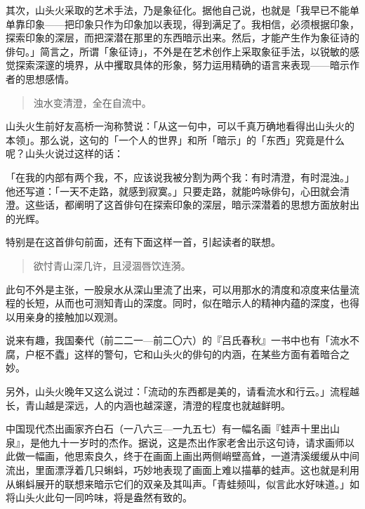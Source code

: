 {    其次，山头火采取的艺术手法，乃是象征化。据他自己说，也就是「我早已不能单单靠印象——把印象只作为印象加以表现，得到满足了。我相信，必须根据印象，探索印象的深层，而把深潜在那里的东西暗示出来。然后，才能产生作为象征诗的俳句。」\footnotemark[4]简言之，所谓「象征诗」，不外是在艺术创作上采取象征手法，以锐敏的感觉探索深邃的境界，从中攫取具体的形象，努力运用精确的语言来表现——暗示作者的思想感情。


    \begin{quote}        浊水变清澄，全在自流中。
    \end{quote}

    山头火生前好友高桥一洵称赞说：「从这一句中，可以千真万确地看得出山头火的本领」\footnotemark[5]。那么说，这句的「一个人的世界」和所「暗示」的「东西」究竟是什么呢？山头火说过这样的话：


    「在我的内部有两个我，不，应该说我被分割为两个我：有时清澄，有时混浊。」他还写道：「一天不走路，就感到寂寞。」只要走路，就能吟咏俳句，心田就会清澄\footnotemark[6]。这些话，都阐明了这首俳句在探索印象的深层，暗示深潜着的思想方面放射出的光辉。


    特别是在这首俳句前面，还有下面这样一首，引起读者的联想。

    \begin{quote}
        欲忖青山深几许，且浸涸唇饮连漪。
    \end{quote}

    此句不外是主张，一股泉水从深山里流了出来，可以用那水的清度和凉度来估量流程的长短，从而也可测知青山的深度。同时，似在暗示人的精神内蕴的深度，也得以用亲身的接触加以观测。

    说来有趣，我国秦代（前二二一—前二〇六）的『吕氏春秋』一书中也有「流水不腐，户枢不蠹」这样的警句，它和山头火的俳句的内涵，在某些方面有着暗合之妙。

    另外，山头火晚年又这么说过：「流动的东西都是美的，请看流水和行云。」流程越长，青山越是深远，人的内涵也越深邃，清澄的程度也就越鲜明。

    中国现代杰出画家齐白石（一八六三—一九五七）有一幅名画『蛙声十里出山泉』，是他九十一岁时的杰作。据说，这是杰出作家老舍出示这句诗，请求画师以此做一幅画，他思索良久，终于在画面上画出两侧峭壁高耸，一道清溪缓缓从中间流出，里面漂浮着几只蝌蚪，巧妙地表现了画面上难以描摹的蛙声。这也就是利用从蝌蚪展开的联想来暗示它们的双亲及其叫声。「青蛙频叫，似言此水好味道。」如将山头火此句一同吟味，将是盎然有致的。

}

